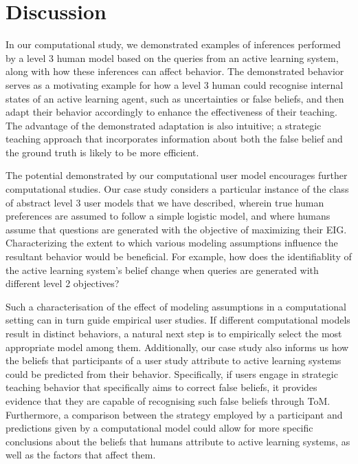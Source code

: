 \documentclass[letterpaper]{article} %
\begin{document}
\section{Discussion}

In our computational study, we demonstrated examples of inferences performed by a level 3 human model based on the queries from an active learning system, along with how these inferences can affect behavior. The demonstrated behavior serves as a motivating example for how a level 3 human could recognise internal states of an active learning agent, such as uncertainties or false beliefs, and then adapt their behavior accordingly to enhance the effectiveness of their teaching. The advantage of the demonstrated adaptation is also intuitive; a strategic teaching approach that incorporates information about both the false belief and the ground truth is likely to be more efficient.

The potential demonstrated by our computational user model encourages further computational studies. Our case study considers a particular instance of the class of abstract level 3 user models that we have described, wherein true human preferences are assumed to follow a simple logistic model, and where humans assume that questions are generated with the objective of maximizing their EIG. Characterizing the extent to which various modeling assumptions influence the resultant behavior would be beneficial. For example, how does the identifiablity of the active learning system's belief change when queries are generated with different level 2 objectives?

Such a characterisation of the effect of modeling assumptions in a computational setting can in turn guide empirical user studies. If different computational models result in distinct behaviors, a natural next step is to empirically select the most appropriate model among them.  Additionally, our case study also informs us how the beliefs that participants of a user study attribute to active learning systems could be predicted from their behavior. Specifically, if users engage in strategic teaching behavior that specifically aims to correct false beliefs, it provides evidence that they are capable of recognising such false beliefs through ToM. Furthermore, a comparison between the strategy employed by a participant and predictions given by a computational model could allow for more specific conclusions about the beliefs that humans attribute to active learning systems, as well as the factors that affect them.
\end{document}
